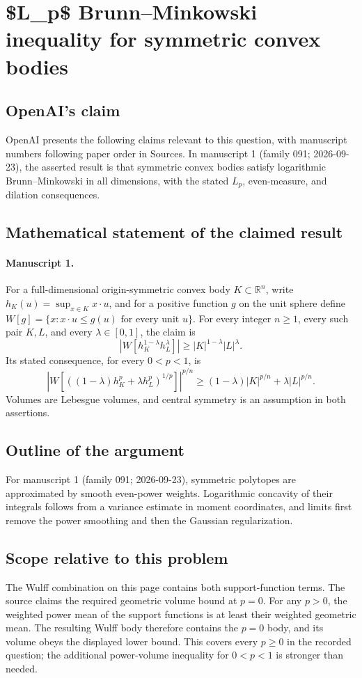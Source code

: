 \documentclass[11pt]{article}
\begin{document}
\section*{\$L\_p\$ Brunn–Minkowski inequality for symmetric convex bodies}

\subsection{OpenAI's claim}
OpenAI presents the following claims relevant to this question, with manuscript numbers following paper order in Sources. In manuscript 1 (family 091; 2026-09-23), the asserted result is that symmetric convex bodies satisfy logarithmic Brunn--Minkowski in all dimensions, with the stated $L_p$, even-measure, and dilation consequences.

\subsection{Mathematical statement of the claimed result}
\paragraph{Manuscript 1.}
For a full-dimensional origin-symmetric convex body $K\subset\mathbb R^n$, write $h_K(u)=\sup_{x\in K}x\cdot u$, and for a positive function $g$ on the unit sphere define $W[g]=\{x:x\cdot u\le g(u)\text{ for every unit }u\}$. For every integer $n\ge1$, every such pair $K,L$, and every $\lambda\in[0,1]$, the claim is
\[
 |W[h_K^{1-\lambda}h_L^{\lambda}]|\ge |K|^{1-\lambda}|L|^{\lambda}.
\]
Its stated consequence, for every $0<p<1$, is
\[
 \left|W[((1-\lambda)h_K^p+\lambda h_L^p)^{1/p}]\right|^{p/n}
 \ge(1-\lambda)|K|^{p/n}+\lambda|L|^{p/n}.
\]
Volumes are Lebesgue volumes, and central symmetry is an assumption in both assertions.

\subsection{Outline of the argument}
For manuscript 1 (family 091; 2026-09-23), symmetric polytopes are approximated by smooth even-power weights. Logarithmic concavity of their integrals follows from a variance estimate in moment coordinates, and limits first remove the power smoothing and then the Gaussian regularization.

\subsection{Scope relative to this problem}
The Wulff combination on this page contains both support-function terms. The source claims the required geometric volume bound at $p=0$. For any $p>0$, the weighted power mean of the support functions is at least their weighted geometric mean. The resulting Wulff body therefore contains the $p=0$ body, and its volume obeys the displayed lower bound. This covers every $p\ge0$ in the recorded question; the additional power-volume inequality for $0<p<1$ is stronger than needed.
\end{document}
